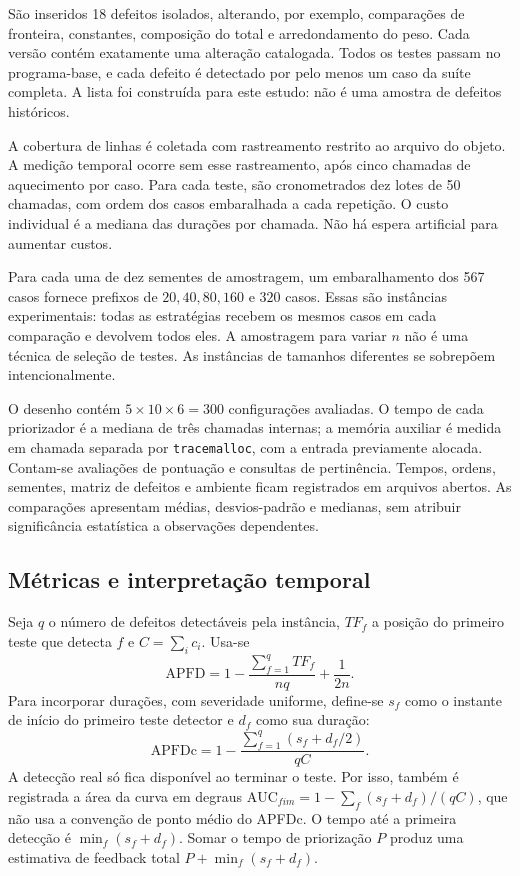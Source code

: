 \documentclass[12pt]{article}
\begin{document}
São inseridos 18 defeitos isolados, alterando, por exemplo, comparações de fronteira, constantes, composição do total e arredondamento do peso. Cada versão contém exatamente uma alteração catalogada. Todos os testes passam no programa-base, e cada defeito é detectado por pelo menos um caso da suíte completa. A lista foi construída para este estudo: não é uma amostra de defeitos históricos.

A cobertura de linhas é coletada com rastreamento restrito ao arquivo do objeto. A medição temporal ocorre sem esse rastreamento, após cinco chamadas de aquecimento por caso. Para cada teste, são cronometrados dez lotes de 50 chamadas, com ordem dos casos embaralhada a cada repetição. O custo individual é a mediana das durações por chamada. Não há espera artificial para aumentar custos.

Para cada uma de dez sementes de amostragem, um embaralhamento dos 567 casos fornece prefixos de $20,40,80,160$ e $320$ casos. Essas são instâncias experimentais: todas as estratégias recebem os mesmos casos em cada comparação e devolvem todos eles. A amostragem para variar $n$ não é uma técnica de seleção de testes. As instâncias de tamanhos diferentes se sobrepõem intencionalmente.

O desenho contém $5\times10\times6=300$ configurações avaliadas. O tempo de cada priorizador é a mediana de três chamadas internas; a memória auxiliar é medida em chamada separada por \texttt{tracemalloc}, com a entrada previamente alocada. Contam-se avaliações de pontuação e consultas de pertinência. Tempos, ordens, sementes, matriz de defeitos e ambiente ficam registrados em arquivos abertos. As comparações apresentam médias, desvios-padrão e medianas, sem atribuir significância estatística a observações dependentes.

\subsection{Métricas e interpretação temporal}
Seja $q$ o número de defeitos detectáveis pela instância, $TF_f$ a posição do primeiro teste que detecta $f$ e $C=\sum_i c_i$. Usa-se
\begin{equation}
\mathrm{APFD}=1-\frac{\sum_{f=1}^{q}TF_f}{nq}+\frac{1}{2n}.
\end{equation}
Para incorporar durações, com severidade uniforme, define-se $s_f$ como o instante de início do primeiro teste detector e $d_f$ como sua duração:
\begin{equation}
\mathrm{APFDc}=1-\frac{\sum_{f=1}^{q}(s_f+d_f/2)}{qC}.
\end{equation}
A detecção real só fica disponível ao terminar o teste. Por isso, também é registrada a área da curva em degraus $\mathrm{AUC}_{fim}=1-\sum_f(s_f+d_f)/(qC)$, que não usa a convenção de ponto médio do APFDc. O tempo até a primeira detecção é $\min_f(s_f+d_f)$. Somar o tempo de priorização $P$ produz uma estimativa de feedback total $P+\min_f(s_f+d_f)$.
\end{document}
